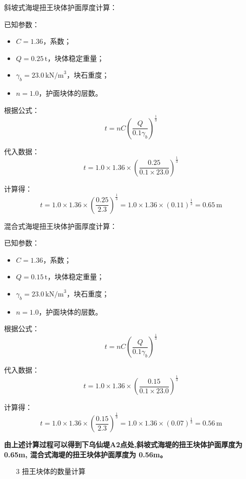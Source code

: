 \documentclass[UTF8, a4paper, 12pt]{ctexart} %
\begin{document}
斜坡式海堤扭王块体护面厚度计算：


已知参数：
\begin{itemize}
    \item $C = 1.36$，系数；
    \item $Q = 0.25\,\text{t}$，块体稳定重量；
    \item $\gamma_b = 23.0\,\text{kN/m}^3$，块石重度；
    \item $n = 1.0$，护面块体的层数。
\end{itemize}

根据公式：
\begin{equation}
    t = nC \left( \frac{Q}{0.1 \gamma_b} \right)^{\frac{1}{3}}
\end{equation}

代入数据：
\[
    t = 1.0 \times 1.36 \times \left( \frac{0.25}{0.1 \times 23.0} \right)^{\frac{1}{3}}
\]

计算得：
\[
    t = 1.0 \times 1.36 \times \left( \frac{0.25}{2.3} \right)^{\frac{1}{3}} = 1.0 \times 1.36 \times (0.11)^{\frac{1}{3}} = 0.65\,\text{m}
\]

混合式海堤扭王块体护面厚度计算：



已知参数：
\begin{itemize}
    \item $C = 1.36$，系数；
    \item $Q = 0.15\,\text{t}$，块体稳定重量；
    \item $\gamma_b = 23.0\,\text{kN/m}^3$，块石重度；
    \item $n = 1.0$，护面块体的层数。
\end{itemize}

根据公式：
\begin{equation}
    t = nC \left( \frac{Q}{0.1 \gamma_b} \right)^{\frac{1}{3}}
\end{equation}

代入数据：
\[
    t = 1.0 \times 1.36 \times \left( \frac{0.15}{0.1 \times 23.0} \right)^{\frac{1}{3}}
\]

计算得：
\[
    t = 1.0 \times 1.36 \times \left( \frac{0.15}{2.3} \right)^{\frac{1}{3}} = 1.0 \times 1.36 \times (0.07)^{\frac{1}{3}} = 0.56\,\text{m}
\]



\textbf{由上述计算过程可以得到下乌仙堤A2点处,斜坡式海堤的扭王块体护面厚度为
0.65m, 混合式海堤的扭王块体护面厚度为 0.56m。}

\begin{itemize}
    \item [3] 扭王块体的数量计算
\end{itemize}
\end{document}
